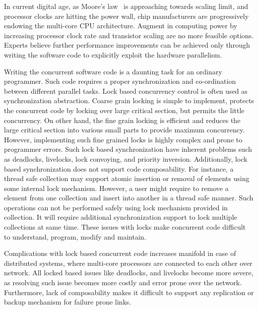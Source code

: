 \documentclass[12pt,english]{report}
\begin{document}
In current digital age, as Moore's law~\cite{schaller1997moore} is approaching towards scaling limit, and processor clocks are hitting the power wall, chip manufacturers are progressively endowing the multi-core CPU architecture. Augment in computing power by increasing processor clock rate and transistor scaling are no more feasible options. Experts believe further performance improvements can be achieved only through writing the software code to explicitly exploit the hardware parallelism. 

Writing the concurrent software code is a daunting task for an ordinary programmer. Such code requires a proper synchronization and co-ordination between different parallel tasks. Lock based concurrency control is often used as synchronization abstraction. Coarse grain locking is simple to implement, protects the concurrent code by locking over large critical section, but permits the little concurrency. On other hand, the fine grain locking is efficient and reduces the large critical section into various small parts to provide maximum concurrency. However, implementing such fine grained locks is highly complex and prone to programmer errors. Such lock based synchronization have inherent problems such as deadlocks, livelocks, lock convoying, and priority inversion. Additionally, lock based synchronization does not support code composability. For instance, a thread safe collection may support atomic insertion or removal of elements using some internal lock mechanism. However, a user might require to remove a element from one collection and insert into another in a thread safe manner. Such operations can not be performed safely using lock mechanism provided in collection. It will require additional synchronization support to lock multiple collections at same time. These issues with locks make concurrent code difficult to understand, program, modify and maintain.

Complications with lock based concurrent code increases manifold in case of distributed systems, where multi-core processors are connected to each other over network. All locked based issues like deadlocks, and livelocks become more severe, as resolving such issue becomes more costly and error prone over the network. Furthermore, lack of composability makes it difficult to support any replication or backup mechanism for failure  prone links.    
\end{document}
